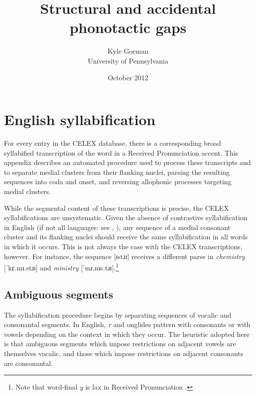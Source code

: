 \documentclass[12pt]{article}
\title{Structural and accidental phonotactic gaps}
\author{Kyle Gorman \\ University of Pennsylvania}
\date{October 2012}
\begin{document}
\maketitle



\appendix
\renewcommand{\arraystretch}{0.25}




\section{English syllabification}
\label{syllabification}

For every entry in the CELEX database, there is a corresponding broad syllabified transcription of the word in a Received Pronunciation accent. This appendix describes an automated procedure used to process these transcripts and to separate medial clusters from their flanking nuclei, parsing the resulting sequences into coda and onset, and reversing allophonic processes targeting medial clusters.

While the segmental content of these transcriptions is precise, the CELEX syllabifications are unsystematic. Given the absence of contrastive syllabification in English (if not all languages: see \citealp[221]{Blevins1995}, \citealp{Elfner2006}), any sequence of a medial consonant cluster and its flanking nuclei should receive the same syllabification in all words in which it occurs. This is not always the case with the CELEX transcriptions, however. For instance, the sequence [ɪstɹɪ] receives a different parse in \emph{chemistry} [ˈkɛ.mɪ.stɹɪ] and \emph{ministry} [ˈmɪ.nɪs.tɹɪ].\footnote{Note that word-final \emph{y} is lax in Received Pronunciation \citep[][II.294]{AOE}.}

\subsection{Ambiguous segments}

The syllabification procedure begins by separating sequences of vocalic and consonantal segments. In English, \emph{r} and onglides pattern with consonants or with vowels depending on the context in which they occur. The heuristic adopted here is that ambiguous segments which impose restrictions on adjacent vowels are themselves vocalic, and those which impose restrictions on adjacent consonants are consonantal.
\end{document}
